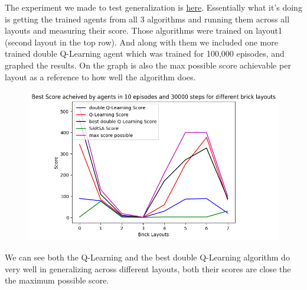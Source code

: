 \documentclass[twoside,11pt]{article}
\begin{document}
The experiment we made to test generalization is \href{https://github.com/duoduocai-dot/csc498-project/blob/main/generalization_tests.py#L10}{here}. Essentially what it's doing is getting the trained agents from all 3 algorithms and running them across all layouts and measuring their score. Those algorithms were trained on layout1 (second layout in the top row). And along with them we included one more trained double Q-Learning agent which was trained for 100,000 episodes, and graphed the results. On the graph is also the max possible score achievable per layout as a reference to how well the algorithm does.
\begin{figure}[H]
\includegraphics[scale=0.6]{BrickLayouts_generalization_tests}
\centering
\end{figure}
We can see both the Q-Learning and the best double Q-Learning algorithm do very well in generalizing across different layouts, both their scores are close the the maximum possible score.
\end{document}

